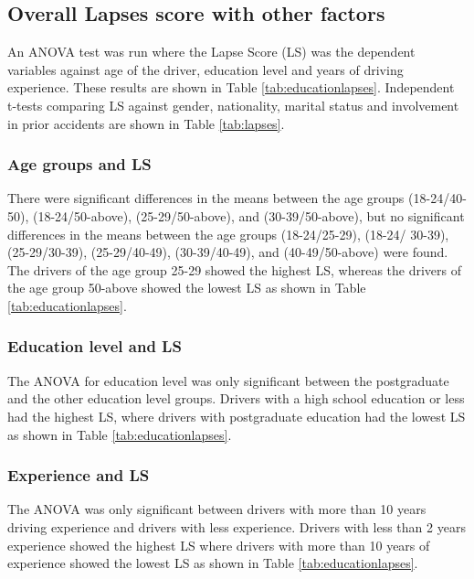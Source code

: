 \documentclass[preprint,12pt,a4paper,authoryear]{elsarticle}
\begin{document}
\subsection{Overall Lapses score with other factors}
An ANOVA test was run where the Lapse Score (LS) was the dependent variables against age of the driver, education level and years of driving experience. These results are shown in Table \ref{tab:educationlapses}. Independent t-tests comparing LS against gender, nationality, marital status and involvement in prior accidents are shown in Table \ref{tab:lapses}.

\subsubsection{Age groups and LS}

There were significant differences in the means between the age groups (18-24/40-50), (18-24/50-above), (25-29/50-above), and (30-39/50-above),  but no significant differences in the means between the age groups (18-24/25-29), (18-24/ 30-39), (25-29/30-39), (25-29/40-49), (30-39/40-49), and (40-49/50-above) were found. The drivers of the age group 25-29 showed the highest LS, whereas the drivers of the age group 50-above showed the lowest LS as shown in Table \ref{tab:educationlapses}.

\subsubsection{Education level and LS}

The ANOVA for education level was only significant between the postgraduate and the other education level groups. Drivers with a high school education or less had the highest LS, where drivers with postgraduate education had the lowest LS as shown in Table \ref{tab:educationlapses}.

\subsubsection{Experience and LS}

The ANOVA was only significant between drivers with more than 10 years driving experience and drivers with less experience. Drivers with less than 2 years experience showed the highest LS where drivers with more than 10 years of experience showed the lowest LS as shown in Table \ref{tab:educationlapses}.
\end{document}

